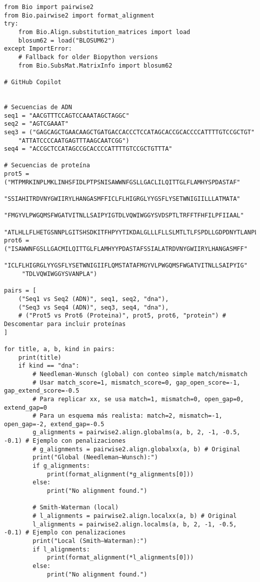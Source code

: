 \documentclass[fleqn,10pt]{article}
\begin{document}
\begin{lstlisting}[style=pythonstyle, caption={Código Python para alineamiento de secuencias con BioPython}, label={lst:biopython_code}]
from Bio import pairwise2
from Bio.pairwise2 import format_alignment
try:
    from Bio.Align.substitution_matrices import load
    blosum62 = load("BLOSUM62")
except ImportError:
    # Fallback for older Biopython versions
    from Bio.SubsMat.MatrixInfo import blosum62

# GitHub Copilot


# Secuencias de ADN
seq1 = "AACGTTTCCAGTCCAAATAGCTAGGC"
seq2 = "AGTCGAAAT"
seq3 = ("GAGCAGCTGAACAAGCTGATGACCACCCTCCATAGCACCGCACCCCATTTTGTCCGCTGT"
    "ATTATCCCCAATGAGTTTAAGCAATCGG")
seq4 = "ACCGCTCCATAGCCGCACCCCATTTTGTCCGCTGTTTA"

# Secuencias de proteína
prot5 = ("MTPMRKINPLMKLINHSFIDLPTPSNISAWWNFGSLLGACLILQITTGLFLAMHYSPDASTAF"
     "SSIAHITRDVNYGWIIRYLHANGASMFFICLFLHIGRGLYYGSFLYSETWNIGIILLLATMATA"
     "FMGYVLPWGQMSFWGATVITNLLSAIPYIGTDLVQWIWGGYSVDSPTLTRFFTFHFILPFIIAAL"
     "ATLHLLFLHETGSNNPLGITSHSDKITFHPYYTIKDALGLLLFLLSLMTLTLFSPDLLGDPDNYTLANPLA")
prot6 = ("ISAWWNFGSLLGACMILQITTGLFLAMHYYPDASTAFSSIALATRDVNYGWIIRYLHANGASMFF"
     "ICLFLHIGRGLYYGSFLYSETWNIGIIFLQMSTATAFMGYVLPWGQMSFWGATVITNLLSAIPYIG"
     "TDLVQWIWGGYSVANPLA")

pairs = [
    ("Seq1 vs Seq2 (ADN)", seq1, seq2, "dna"),
    ("Seq3 vs Seq4 (ADN)", seq3, seq4, "dna"),
    # ("Prot5 vs Prot6 (Proteina)", prot5, prot6, "protein") # Descomentar para incluir proteínas
]

for title, a, b, kind in pairs:
    print(title)
    if kind == "dna":
        # Needleman-Wunsch (global) con conteo simple match/mismatch
        # Usar match_score=1, mismatch_score=0, gap_open_score=-1, gap_extend_score=-0.5
        # Para replicar xx, se usa match=1, mismatch=0, open_gap=0, extend_gap=0
        # Para un esquema más realista: match=2, mismatch=-1, open_gap=-2, extend_gap=-0.5
        g_alignments = pairwise2.align.globalms(a, b, 2, -1, -0.5, -0.1) # Ejemplo con penalizaciones
        # g_alignments = pairwise2.align.globalxx(a, b) # Original
        print("Global (Needleman–Wunsch):")
        if g_alignments:
            print(format_alignment(*g_alignments[0]))
        else:
            print("No alignment found.")
            
        # Smith-Waterman (local)
        # l_alignments = pairwise2.align.localxx(a, b) # Original
        l_alignments = pairwise2.align.localms(a, b, 2, -1, -0.5, -0.1) # Ejemplo con penalizaciones
        print("Local (Smith–Waterman):")
        if l_alignments:
            print(format_alignment(*l_alignments[0]))
        else:
            print("No alignment found.")
            

\end{lstlisting}
\end{document}
